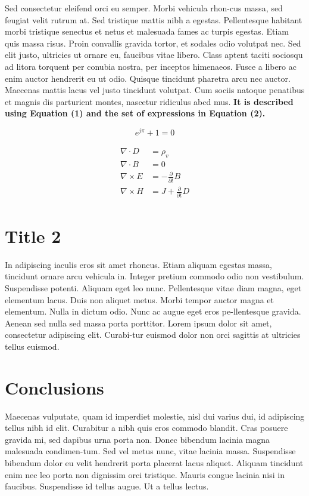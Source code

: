 \documentclass[colTwo]{IIR}
\theoremstyle{definition}
\begin{document}
  

Sed consectetur eleifend orci eu semper. Morbi vehicula rhon-cus massa, sed feugiat velit rutrum at. Sed tristique mattis nibh a egestas. Pellentesque habitant morbi tristique senectus et netus et malesuada fames ac turpis egestas. Etiam quis massa risus. Proin convallis gravida tortor, et sodales odio volutpat nec. Sed elit justo, ultricies ut ornare eu, faucibus vitae libero. Class aptent taciti sociosqu ad litora torquent per conubia nostra, per inceptos himenaeos. Fusce a libero ac enim auctor hendrerit eu ut odio. Quisque tincidunt pharetra arcu nec auctor. Maecenas mattis lacus vel justo tincidunt volutpat. Cum sociis natoque penatibus et magnis dis parturient montes, nascetur ridiculus abcd mus. \textbf{It is described using Equation (1) and the set of expressions in Equation (2).}

\begin{equation}
e^{j\pi}+1=0
\end{equation}

\begin{align}
\begin{split}
\nabla \cdot D&=\rho_v\\
\nabla\cdot B&=0\\
\nabla \times E&=-\frac{\partial }{\partial t}B\\
\nabla\times H&=J+\frac{\partial }{\partial t}D
\end{split}
\end{align}


\section{Title 2}
In adipiscing iaculis eros sit amet rhoncus. Etiam aliquam egestas massa, tincidunt ornare arcu vehicula in. Integer pretium commodo odio non vestibulum. Suspendisse potenti. Aliquam eget leo nunc. Pellentesque vitae diam magna, eget elementum lacus. Duis non aliquet metus. Morbi tempor auctor magna et elementum. Nulla in dictum odio. Nunc ac augue eget eros pe-llentesque gravida. Aenean sed nulla sed massa porta porttitor. Lorem ipsum dolor sit amet, consectetur adipiscing elit. Curabi-tur euismod dolor non orci sagittis at ultricies tellus euismod. 


\section{Conclusions}
Maecenas vulputate, quam id imperdiet molestie, nisl dui varius dui, id adipiscing tellus nibh id elit. Curabitur a nibh quis eros commodo blandit. Cras posuere gravida mi, sed dapibus urna porta non. Donec bibendum lacinia magna malesuada condimen-tum. Sed vel metus nunc, vitae lacinia massa. Suspendisse bibendum dolor eu velit hendrerit porta placerat lacus aliquet. Aliquam tincidunt enim nec leo porta non dignissim orci tristique. Mauris congue lacinia nisi in faucibus. Suspendisse id tellus augue. Ut a tellus lectus.
\end{document}
